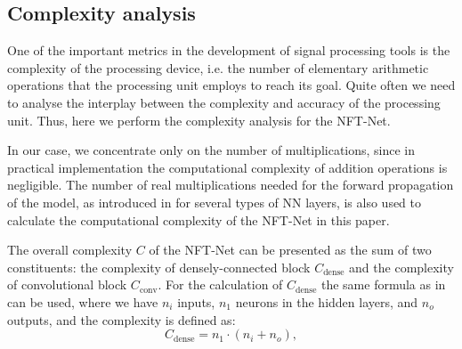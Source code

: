 \subsection{Complexity analysis}
One of the important metrics in the development of signal processing tools is the complexity of the processing device, i.e. the number of elementary arithmetic operations that the processing unit employs to reach its goal. 
Quite often we need to analyse the interplay between the complexity and accuracy of the processing unit. Thus, here we perform the complexity analysis for the NFT-Net.

In our case, we concentrate only on the number of multiplications, since in practical implementation the computational complexity of addition operations is negligible. 
The number of real multiplications needed for the forward propagation of the model, as introduced in \cite{freire2021performance} for several types of NN layers, is also used to calculate the computational complexity of the NFT-Net in this paper. 

The overall complexity $C$ of the NFT-Net can be presented as the sum of two constituents: the complexity of densely-connected block $C_{\text{dense}}$ and the complexity of convolutional block $C_{\text{conv}}$. 
For the calculation of $C_{\text{dense}}$ the same formula as in \cite{freire2021performance} can be used, where we have $n_i$ inputs, $n_1$ neurons in the hidden layers, and $n_o$ outputs, and the complexity is defined as:
\begin{equation}
C_{\text{dense}}=  n_1 \cdot (n_{i} + n_{o}) {,}
\label{eq:c_dense}
\end{equation}

